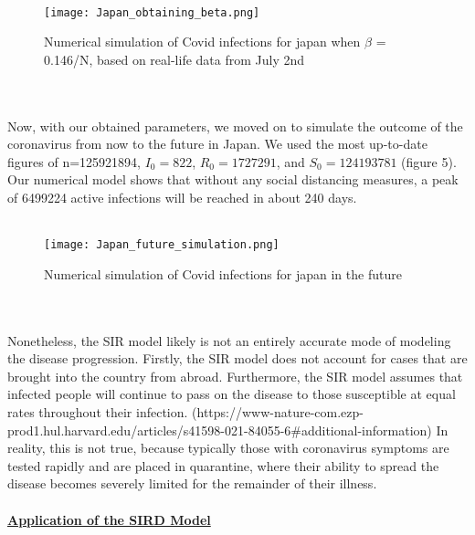 \documentclass[11pt]{article}
\theoremstyle{definition}
\begin{document}
{\\
\begin{figure}[htp]
\centering
    \texttt{[image: Japan\_obtaining\_beta.png]}
    \caption{Numerical simulation of Covid infections for japan when $\beta$ = 0.146/N, based on real-life data from July 2nd}
\end{figure}\\
\\
Now, with our obtained parameters, we moved on to simulate the outcome of the coronavirus from now to the future in Japan. We used the most up-to-date figures of n=125921894, $I_{0} = 822$, $R_{0} = 1727291$, and $S_{0} = 124193781$ (figure 5). Our numerical model shows that without any social distancing measures, a peak of 6499224 active infections will be reached in about 240 days.
\\
\\
\begin{figure}[htp]
\centering
    \texttt{[image: Japan\_future\_simulation.png]}
    \caption{Numerical simulation of Covid infections for japan in the future}
\end{figure}\\
\\

Nonetheless, the SIR model likely is not an entirely accurate mode of modeling the disease progression. Firstly, the SIR model does not account for cases that are brought into the country from abroad.  Furthermore, the SIR model assumes that infected people will continue to pass on the disease to those susceptible at equal rates throughout their infection. (https://www-nature-com.ezp-prod1.hul.harvard.edu/articles/s41598-021-84055-6#additional-information) In reality, this is not true, because typically those with coronavirus symptoms are tested rapidly and are placed in quarantine, where their ability to spread the disease becomes severely limited for the remainder of their illness. 
\\
\\
\textbf{\underline{Application of the SIRD Model}}\\

}
\end{document}

